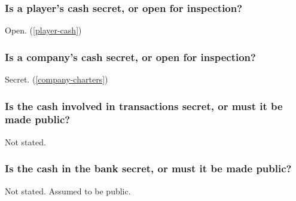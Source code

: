 \subsubsection{Is a player's cash secret, or open for inspection?}
Open. (\autoref{player-cash})

\subsubsection{Is a company's cash secret, or open for inspection?}
Secret. (\autoref{company-charters})

\subsubsection{Is the cash involved in transactions secret, or must it be
  made public?}
Not stated.

\subsubsection{Is the cash in the bank secret, or must it be made public?}
Not stated. Assumed to be public.

